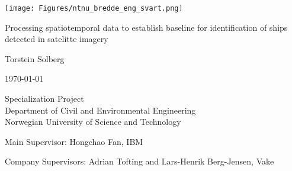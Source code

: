 \thispagestyle{empty}
\texttt{[image: Figures/ntnu\_bredde\_eng\_svart.png]}
\vspace{6pc}

\Huge{Processing spatiotemporal data to establish baseline for identification of ships detected in satelitte imagery }
\vspace{6pc}

\Large{Torstein Solberg}
\vspace{1pc}

\large{\monthyeardate\today}
\vspace{2pc}

Specialization Project\\
Department of Civil and Environmental Engineering\\
Norwegian University of Science and Technology






\vfill

\noindent Main Supervisor: Hongchao Fan, IBM

\noindent Company Supervisors: Adrian Tofting and Lars-Henrik Berg-Jensen, Vake


